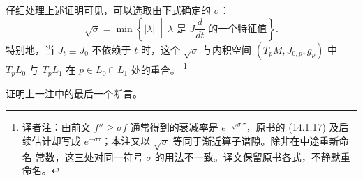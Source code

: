 \begin{remark}
\label{rem:decay-rate-kahler-angle}
仔细处理上述证明可见，可以选取由下式确定的 $\sigma$：
\[
  \sqrt\sigma
  =\min\left\{
    |\lambda|
    \ \middle|\
    \lambda\text{ 是 }J\frac d{dt}\text{ 的一个特征值}
  \right\}.
\]
特别地，当 $J_t\equiv J_0$ 不依赖于 $t$ 时，这个 $\sqrt\sigma$ 与\personHermitian{}内积空间 $(T_pM,J_{0,p},g_p)$ 中 $T_pL_0$ 与 $T_pL_1$ 在
$p\in L_0\cap L_1$ 处的\emph{\termKahlerAngle{}}重合。
\footnote{译者注：由前文 $f''\geq\sigma f$ 通常得到的衰减率是
$e^{-\sqrt\sigma\tau}$，原书的 (14.1.17) 及后续估计却写成
$e^{-\sigma\tau}$；本注又以 $\sqrt\sigma$ 等同于渐近算子谱隙。除非在中途重新命名
常数，这三处对同一符号 $\sigma$ 的用法不一致。译文保留原书各式，不静默重命名。}
\end{remark}

\begin{exercise}
\label{ex:kahler-angle-decay-rate}
证明上一注中的最后一个断言。
\end{exercise}
